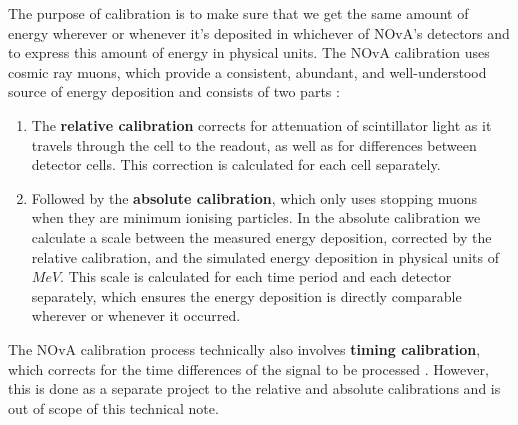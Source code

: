 \documentclass[12pt,a4paper]{article}
\begin{document}
The purpose of calibration is to make sure that we get the same amount of energy wherever or whenever it's deposited in whichever of NOvA's detectors and to express this amount of energy in physical units. The NOvA calibration uses cosmic ray muons, which provide a consistent, abundant, and well-understood source of energy deposition and consists of two parts \cite{NOVA-doc-7410}:
\begin{enumerate}
\item The \textbf{relative calibration} corrects for attenuation of scintillator light as it travels through the cell to the readout, as well as for differences between detector cells. This correction is calculated for each cell separately.
\item Followed by the \textbf{absolute calibration}, which only uses stopping muons when they are minimum ionising particles. In the absolute calibration we calculate a scale between the measured energy deposition, corrected by the relative calibration, and the simulated energy deposition in physical units of $\unit{MeV}$. This scale is calculated for each time period and each detector separately, which ensures the energy deposition is directly comparable wherever or whenever it occurred.
\end{enumerate}

The NOvA calibration process technically also involves \textbf{timing calibration}, which corrects for the time differences of the signal to be processed \cite{NinerThesis}. However, this is done as a separate project to the relative and absolute calibrations and is out of scope of this technical note.



\end{document}
